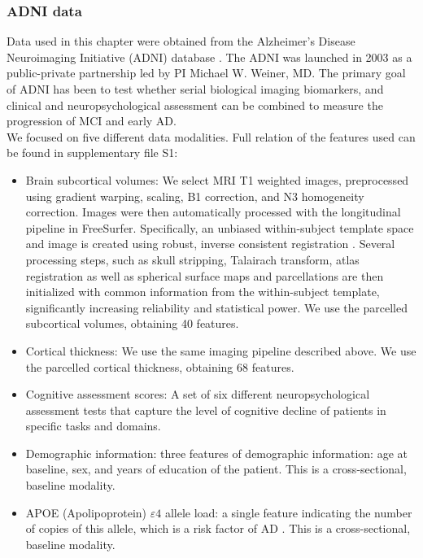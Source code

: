 \subsubsection{ADNI data}

Data used in this chapter were obtained from the Alzheimer’s Disease Neuroimaging Initiative (ADNI) database \cite{Mueller2005}. The ADNI was launched in 2003 as a public-private partnership led by PI Michael W. Weiner, MD. The primary goal of ADNI has been to test whether serial biological imaging biomarkers, and clinical and neuropsychological assessment can be combined to measure the progression of MCI and early AD. \\

We focused on five different data modalities. Full relation of the features used can be found in supplementary file S1: \\

\begin{itemize}
    \item Brain subcortical volumes: We select MRI T1 weighted images, preprocessed using gradient warping, scaling, B1 correction, and N3 homogeneity correction. Images were then automatically processed with the longitudinal pipeline \cite{Reuter2012} in FreeSurfer. Specifically, an unbiased within-subject template space and image is created using robust, inverse consistent registration \cite{Reuter2010}. Several processing steps, such as skull stripping, Talairach transform, atlas registration as well as spherical surface maps and parcellations are then initialized with common information from the within-subject template, significantly increasing reliability and statistical power. We use the parcelled subcortical volumes, obtaining 40 features.
    \item Cortical thickness: We use the same imaging pipeline described above. We use the parcelled cortical thickness, obtaining 68 features.
    \item Cognitive assessment scores: A set of six different neuropsychological assessment tests that capture the level of cognitive decline of patients in specific tasks and domains. 
    \item Demographic information: three features of demographic information: age at baseline, sex, and years of education of the patient. This is a cross-sectional, baseline modality.
    \item APOE (Apolipoprotein) $\varepsilon4$ allele load: a single feature indicating the number of copies of this allele, which is a risk factor of AD \cite{Saunders1993}. This is a cross-sectional, baseline modality.
\end{itemize}

